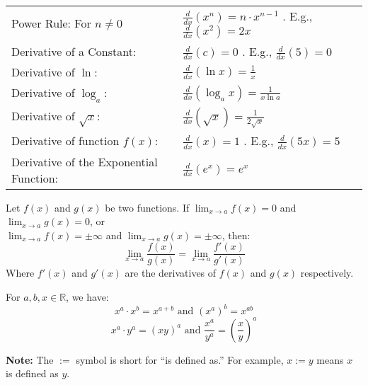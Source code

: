 \begin{theo}

    \begin{tabular}{ll}
        Power Rule: For \( n \neq 0 \) & \( \frac{d}{dx}(x^n) = n \cdot x^{n-1} \) . E.g., \( \frac{d}{dx}(x^2) = 2x \) \\
        Derivative of a Constant: & \( \frac{d}{dx}(c) = 0 \) . E.g., \( \frac{d}{dx}(5) = 0 \) \\
        Derivative of \( \ln \): & \( \frac{d}{dx}(\ln x) = \frac{1}{x} \) \\
        Derivative of \( \log_a \): & \( \frac{d}{dx}(\log_a x) = \frac{1}{x \ln a} \) \\
        Derivative of \( \sqrt{x} \): & \( \frac{d}{dx}(\sqrt{x}) = \frac{1}{2\sqrt{x}} \) \\
        Derivative of function \( f(x) \): & \( \frac{d}{dx}(x) = 1 \) . E.g., \( \frac{d}{dx}(5x) = 5 \) \\
        Derivative of the Exponential Function: & \( \frac{d}{dx}(e^x) = e^x \) \\
    \end{tabular}
\end{theo}

\begin{theo}

    \label{thm:lhospital}
    
    Let \(f(x)\) and \(g(x)\) be two functions. If \(\lim_{x\to a}f(x) = 0\) and \(\lim_{x\to a}g(x) = 0\), or\\ \(\lim_{x\to a}f(x) = \pm\infty\) and \(\lim_{x\to a}g(x) = \pm\infty\), then:
    \[\lim_{x\to a}\dfrac{f(x)}{g(x)} = \lim_{x\to a}\dfrac{f'(x)}{g'(x)}\]
    Where \(f'(x)\) and \(g'(x)\) are the derivatives of \(f(x)\) and \(g(x)\) respectively.
\end{theo}

\newpage 

\begin{theo}

    \label{thm:addexp}
    
    For $a,b,x\in\mathbb{R}$, we have:
    \Large
    \[x^a\cdot x^b = x^{a+b} \text{ and } (x^a)^b=x^{ab}\]
    \[x^a\cdot y^a = (xy)^a \text{ and } \dfrac{x^a}{y^a} = \left(\dfrac{x}{y}\right)^a\]
    \normalsize

\end{theo}

\begin{Note}
    \textbf{Note:} The $:=$ symbol is short for ``is defined as.'' For example, $x:=y$ means $x$ is defined as $y$.
\end{Note}

